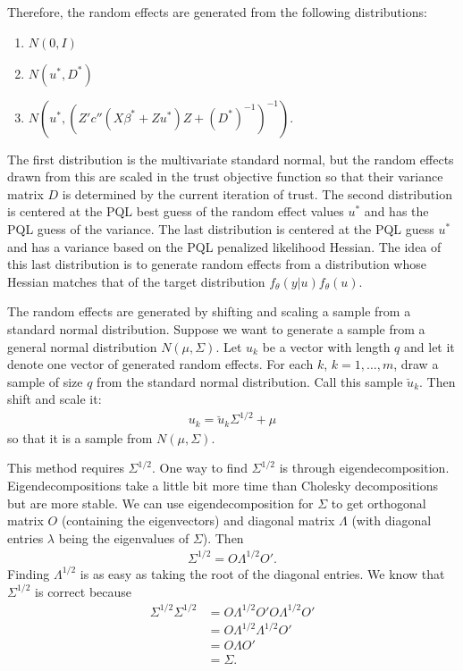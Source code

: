 \documentclass{article}
\begin{document}
Therefore, the random effects are generated from the following distributions:
\begin{enumerate}
\item $N(0,I)$
\item $N(u^*,D^*)$
\item $N(u^*,(Z'  c''(X \beta^*+Zu^*) Z +(D^*)^{-1}   )^{-1})$.
\end{enumerate}

The first distribution is the multivariate standard normal, but the random effects drawn from this are scaled in the trust objective function so that their variance matrix $D$ is determined by the current iteration of trust.   The second distribution is centered at the PQL best guess of the random effect values $u^*$ and  has the PQL guess of the variance. The last distribution is centered at the PQL guess $u^*$ and has a variance based on the PQL penalized likelihood Hessian.  The idea of this last distribution is to generate random effects from a distribution whose Hessian matches that of the target distribution $f_\theta(y|u) f_\theta(u)$.

The random effects are generated by shifting and scaling a sample from a  standard normal distribution.  Suppose we want to generate a sample from a general normal distribution $N(\mu,\Sigma)$.  Let $u_k$ be a vector with length $q$ and let it denote one vector of generated random effects.  For each $k$, $k=1,\ldots,m$, draw a sample of size $q$ from the standard normal distribution. Call this sample $\breve{u}_k$. Then shift and scale it:
\begin{align}
u_k = \breve{u}_k \Sigma^{1/2} + \mu
\end{align}
so that it is a sample from $N(\mu,\Sigma)$.

This method requires $\Sigma^{1/2}$. One way to find $\Sigma^{1/2}$ is through eigendecomposition. Eigendecompositions take a little bit more time than Cholesky decompositions but are more stable. We can use eigendecomposition for $\Sigma$ to get orthogonal matrix $O$ (containing the eigenvectors) and diagonal matrix $\Lambda$ (with diagonal entries $\lambda$ being the eigenvalues of $\Sigma$).  Then
\begin{align}
\Sigma^{1/2}= O \Lambda^{1/2} O'.
\end{align}
Finding $\Lambda^{1/2}$ is as easy as taking the root of the diagonal entries.  We know that $\Sigma^{1/2}$ is correct because
\begin{align}
\Sigma^{1/2} \Sigma^{1/2} &= O \Lambda^{1/2} O'O \Lambda^{1/2} O'\\
&= O \Lambda^{1/2}\Lambda^{1/2} O'\\
&=O \Lambda O' \\
&= \Sigma.
\end{align}
\end{document}
